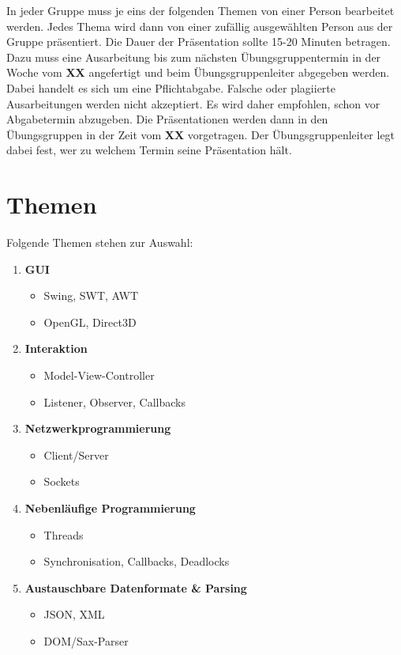 \documentclass{programmierpraktikum}
\subtitle{Seminarreferate}
\begin{document}
\maketitle
%
In jeder Gruppe muss je eins der folgenden Themen von einer Person be\-ar\-bei\-tet werden. Jedes Thema wird dann von einer zufällig ausgewählten Person aus der Gruppe präsentiert. Die Dauer der Präsentation sollte 15-20 Minuten betragen. Dazu muss eine Ausarbeitung bis zum nächsten Übungsgruppentermin in der Woche vom \textbf{XX} angefertigt und beim Übungsgruppenleiter ab\-ge\-ge\-ben werden. Dabei handelt es sich um eine Pflichtabgabe. Falsche oder plagiierte Ausarbeitungen werden nicht akzeptiert. Es wird daher empfohlen, schon vor Abgabetermin abzugeben. Die Präsentationen werden dann in den Übungsgruppen in der Zeit vom \textbf{XX} vorgetragen. Der Übungsgruppenleiter legt dabei fest, wer zu welchem Termin seine Präsentation hält.
%
\section{Themen}
Folgende Themen stehen zur Auswahl:
\begin{enumerate}
  \renewcommand{\labelenumi}{\textbf{\theenumi.}}
  \item \textbf{GUI}
    \begin{itemize}
      \item Swing, SWT, AWT
      \item OpenGL, Direct3D
    \end{itemize}
  \item \textbf{Interaktion}
    \begin{itemize}
      \item Model-View-Controller
      \item Listener, Observer, Callbacks
    \end{itemize}
  \item \textbf{Netzwerkprogrammierung}
    \begin{itemize}
      \item Client/Server
      \item Sockets
    \end{itemize}
  \item \textbf{Nebenläufige Programmierung}
    \begin{itemize}
      \item Threads
      \item Synchronisation, Callbacks, Deadlocks
    \end{itemize}
  \item \textbf{Austauschbare Datenformate \& Parsing}
    \begin{itemize}
      \item JSON, XML
      \item DOM/Sax-Parser
    \end{itemize}
\end{enumerate}
\end{document}
